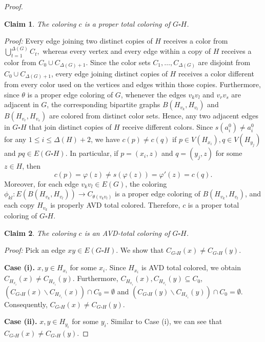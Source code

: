 \documentclass[12pt]{article}
\theoremstyle{definition}
\newtheorem{claim}{Claim}
\begin{document}
\begin{proof}
\begin{claim}\label{Claim 1}
{\em The coloring $c$ is a proper total coloring of $G\square H$.}
\end{claim}

\textit{Proof:}
Every edge joining two distinct copies of $H$ receives a color from
$
\bigcup\limits_{t=1}^{\Delta(G)} C_t,
$
whereas every vertex and every edge within a copy of $H$ receives a color from $C_0\cup C_{\Delta(G)+1}$. Since the color sets $C_1,\ldots,C_{\Delta(G)}$ are disjoint from $C_0\cup C_{\Delta(G)+1}$, every edge joining distinct copies of $H$ receives a color different from every color used on the vertices and edges within those copies.
Furthermore, since $\theta$ is a proper edge coloring of $G$, whenever the edges $v_kv_l$ and $v_rv_s$ are adjacent in $G$, the corresponding bipartite graphs $B(H_{v_k},H_{v_l})$ and $B(H_{v_r},H_{v_s})$ are colored from distinct color sets. Hence, any two adjacent edges in $G\square H$ that join distinct copies of $H$ receive different colors.
Since $s(a^{0}_{i})\neq a^{0}_{i}$ for any $1\leq i\leq \Delta(H)+2$, we have $c(p)\neq c(q)$ if $p\in V(H_{x_i}), q\in V(H_{y_j})$ and $pq\in E(G\square H)$.  
In particular, if $p=(x_{i},z)$ and $q=(y_{j},z)$ for some $z\in H$, then \[c(p)=\varphi(z)\neq s(\varphi(z))=\varphi'(z)=c(q).\]
Moreover, for each edge $v_kv_l\in E(G)$, the coloring
$
\phi_{kl}:E(B(H_{v_k},H_{v_l}))\rightarrow C_{\theta(v_kv_l)}
$
is a proper edge coloring of $B(H_{v_k},H_{v_l})$, and each copy $H_{v_k}$ is properly AVD total colored. Therefore, $c$ is a proper total coloring of $G\square H$. 

\begin{claim}\label{Claim 2}
{\em The coloring $c$ is an AVD-total coloring of $G\square H$.}
\end{claim}

\textit{Proof:}
Pick an edge $xy\in E(G\square H)$. We show that $C_{G\square H}(x)\neq C_{G\square H}(y)$.  

\textbf{Case (i).} $x,y\in H_{x_i}$ for some $x_i$.
Since $H_{x_i}$ is AVD total colored, we obtain $C_{H_{x_{i}}}(x)\neq C_{H_{x_{i}}}(y)$. Furthermore, $C_{H_{x_{i}}}(x), C_{H_{x_{i}}}(y)\subseteq C_0$, $(C_{G\square H}(x)\backslash C_{H_{x_{i}}}(x)) \cap C_0 =\emptyset$ and $(C_{G\square H}(y)\backslash C_{H_{x_{i}}}(y)) \cap C_0 =\emptyset$.
Consequently, $C_{G\square H}(x)\neq C_{G\square H}(y)$.   

\textbf{Case (ii).} $x,y\in H_{y_i}$ for some $y_i$. Similar to Case (i), we can see that 
$C_{G\square H}(x)\neq C_{G\square H}(y)$.   



\end{proof}
\end{document}
